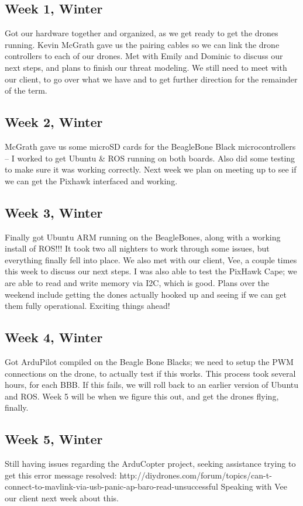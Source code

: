 \documentclass[IEEEtran,letterpaper,10pt,notitlepage,draftclsnofoot,onecolumn]{article}
\begin{document}
                            \subsection{Week 1, Winter}
                            Got our hardware together and organized, as we get ready to get the drones running. Kevin McGrath gave us the pairing cables so we can link the drone controllers to each of our drones. Met with Emily and Dominic to discuss our next steps, and plans to finish our threat modeling. We still need to meet with our client, to go over what we have and to get further direction for the remainder of the term.
                            \subsection{Week 2, Winter}
                            McGrath gave us some microSD cards for the BeagleBone Black microcontrollers -- I worked to get Ubuntu & ROS running on both boards. Also did some testing to make sure it was working correctly. Next week we plan on meeting up to see if we can get the Pixhawk interfaced and working.
                            \subsection{Week 3, Winter}
                            Finally got Ubuntu ARM running on the BeagleBones, along with a working install of ROS!!! It took two all nighters to work through some issues, but everything finally fell into place. We also met with our client, Vee, a couple times this week to discuss our next steps. I was also able to test the PixHawk Cape; we are able to read and write memory via I2C, which is good. Plans over the weekend include getting the dones actually hooked up and seeing if we can get them fully operational. Exciting things ahead!
                            \subsection{Week 4, Winter}
                            Got ArduPilot compiled on the Beagle Bone Blacks; we need to setup the PWM connections on the drone, to actually test if this works. This process took several hours, for each BBB. If this fails, we will roll back to an earlier version of Ubuntu and ROS. Week 5 will be when we figure this out, and get the drones flying, finally.
                            \subsection{Week 5, Winter}
                            Still having issues regarding the ArduCopter project, seeking assistance trying to get this error message resolved: http://diydrones.com/forum/topics/can-t-connect-to-mavlink-via-usb-panic-ap-baro-read-unsuccessful Speaking with Vee our client next week about this.
\end{document}
